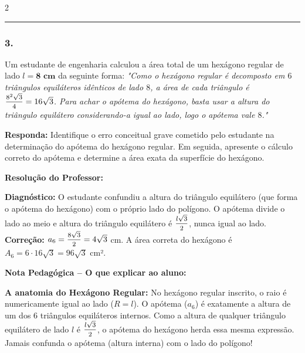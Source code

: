 \begin{multicols*}{2}
\par\vspace{\espacoQuestao}

\noindent\textcolor{CorLinha}{\rule{\linewidth}{0.5pt}} 
\par\vspace{\espacoPreQuestao}

\subsubsection*{3.} Um estudante de engenharia calculou a área total de um hexágono regular de lado $l = \mathbf{8\text{ cm}}$ da seguinte forma: \textit{"Como o hexágono regular é decomposto em $6$ triângulos equiláteros idênticos de lado $8$, a área de cada triângulo é $\mfrac{8^2\sqrt{3}}{4} = 16\sqrt{3}$. Para achar o apótema do hexágono, basta usar a altura do triângulo equilátero considerando-a igual ao lado, logo o apótema vale $8$."}

\begin{boxresponda}
\textbf{Responda:} Identifique o erro conceitual grave cometido pelo estudante na determinação do apótema do hexágono regular. Em seguida, apresente o cálculo correto do apótema e determine a área exata da superfície do hexágono.
\end{boxresponda}

\ifgabarito
    \begin{tcolorbox}[colback=CorTitUm!5, colframe=CorTitUm, boxrule=1pt, arc=4pt, left=6pt, right=6pt, top=6pt, bottom=6pt]
    \small\textbf{\textcolor{CorTitUm}{Resolução do Professor:}}\par\vspace{0.1cm}
    \color{CinzaEscuro}
    \textbf{Diagnóstico:} O estudante confundiu a altura do triângulo equilátero (que forma o apótema do hexágono) com o próprio lado do polígono. O apótema divide o lado ao meio e altura do triângulo equilátero é $\mfrac{l\sqrt{3}}{2}$, nunca igual ao lado.
    \\[0.1cm]
    \textbf{Correção:} $a_6 = \mfrac{8\sqrt{3}}{2} = 4\sqrt{3}$ cm. A área correta do hexágono é $A_6 = 6 \cdot 16\sqrt{3} = 96\sqrt{3}$ cm².
    \end{tcolorbox}
    
    \begin{boxpedagogica}
    \textbf{\textcolor{CorVerdeBorda}{Nota Pedagógica -- O que explicar ao aluno:}}\par\vspace{0.1cm}
    \color{CinzaEscuro}
    \textbf{A anatomia do Hexágono Regular:} No hexágono regular inscrito, o raio é numericamente igual ao lado ($R = l$). O apótema ($a_6$) é exatamente a altura de um dos 6 triângulos equiláteros internos. Como a altura de qualquer triângulo equilátero de lado $l$ é $\mfrac{l\sqrt{3}}{2}$, o apótema do hexágono herda essa mesma expressão. Jamais confunda o apótema (altura interna) com o lado do polígono!
    \end{boxpedagogica}
\fi


\end{multicols*}
